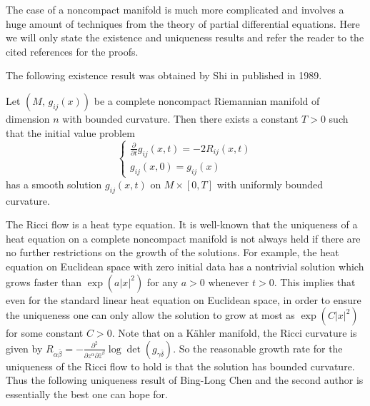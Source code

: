 The case of a noncompact manifold is much more complicated and
involves a huge amount of techniques from the theory of partial
differential equations. Here we will only state the existence and
uniqueness results and refer the reader to the cited references
for the proofs.

The following existence result was obtained by Shi in \cite{Sh89}
published in 1989.

\begin{theorem}
  \label{thm:cz-short-time-existence-on-complete-noncompact-manifolds}
Let $(M,\, g_{ij}(x))$ be a complete noncompact Riemannian
manifold of dimension $n$ with bounded curvature. Then there
exists a constant $T>0$ such that the initial value problem
$$
\begin{cases}
  \frac{\partial}{\partial t}g_{ij}(x,t)=-2R_{ij}(x,t)
          \\[4mm]
  g_{ij}(x,0)=g_{ij}(x)
       \end{cases}
$$
has a smooth solution $g_{ij}(x,t)$ on $M\times [0,T]$ with
uniformly bounded curvature.
\end{theorem}

The Ricci flow is a heat type equation. It is well-known that the
uniqueness of a heat equation on a complete noncompact manifold is
not always held if there are no further restrictions on the growth
of the solutions. For example, the heat equation on Euclidean
space with zero initial data has a nontrivial solution which grows
faster than $\exp(a|x|^2)$ for any $a>0$ whenever $t>0$. This
implies that even for the standard linear heat equation on
Euclidean space, in order to ensure the uniqueness one can only
allow the solution to grow at most as $\exp(C|x|^2)$ for some
constant $C>0$. Note that on a K\"ahler manifold, the Ricci
curvature is given by $R_{\alpha\bar\beta} = - \frac{\partial
^2}{\partial z^{\alpha}\partial \bar{z}^{\beta}}
\log\det(g_{\gamma\bar{\delta}})$. So the reasonable growth rate
for the uniqueness of the Ricci flow to hold is that the solution
has bounded curvature. Thus the following uniqueness result of
Bing-Long Chen and the second author \cite{CZ05U} is essentially
the best one can hope for.

